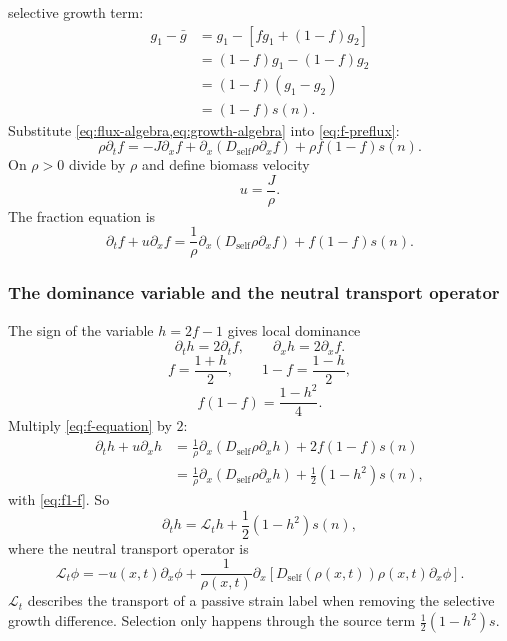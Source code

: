 \documentclass[11pt,a4paper]{report}
\newcommand{\Dself}{D_{\mathrm{self}}}
\newcommand{\pd}{\partial}
\newcommand{\Lop}{\mathcal L}
\begin{document}
	selective growth term:
	\begin{align}
		g_1-\bar g
		&=g_1-[fg_1+(1-f)g_2]\nonumber\\
		&=(1-f)g_1-(1-f)g_2\nonumber\\
		&=(1-f)(g_1-g_2)\nonumber\\
		&=(1-f)s(n).
		\label{eq:growth-algebra}
	\end{align}
	Substitute \cref{eq:flux-algebra,eq:growth-algebra} into \cref{eq:f-preflux}:
	\begin{equation}
		\rho\pd_t f=-J\pd_xf+
		\pd_x(\Dself\rho\pd_xf)+\rho f(1-f)s(n).
	\end{equation}
	On \(\rho>0\) divide by \(\rho\) and define biomass velocity
	\begin{equation}
		u=\frac{J}{\rho}.
		\label{eq:u-def}
	\end{equation}
	The fraction equation is
	\begin{equation}
		{
			\pd_t f+u\pd_xf
			=\frac1\rho\pd_x(\Dself\rho\pd_xf)+f(1-f)s(n).
		}
		\label{eq:f-equation}
	\end{equation}
	
	\subsubsection{The dominance variable and the neutral transport operator}
	
	The sign of the variable \(h=2f-1\) gives local dominance
	\begin{equation}
		\pd_t h=2\pd_t f,
		\qquad
		\pd_x h=2\pd_x f.
	\end{equation}
	\begin{equation}
		f=\frac{1+h}{2},
		\qquad
		1-f=\frac{1-h}{2},
	\end{equation}
	\begin{equation}
		f(1-f)=\frac{1-h^2}{4}.
		\label{eq:f1-f}
	\end{equation}
	Multiply \cref{eq:f-equation} by \(2\):
	\begin{align}
		\pd_t h+u\pd_xh
		&=\frac1\rho\pd_x(\Dself\rho\pd_xh)+2f(1-f)s(n)\nonumber\\
		&=\frac1\rho\pd_x(\Dself\rho\pd_xh)
		+\frac12(1-h^2)s(n),
	\end{align}
	with \cref{eq:f1-f}. So
	\begin{equation}
		{
			\pd_t h=\Lop_t h+\frac12(1-h^2)s(n),
		}
		\label{eq:h-equation}
	\end{equation}
	where the neutral transport operator is
	\begin{equation}
		{
			\Lop_t\phi=-u(x,t)\pd_x\phi+\frac1{\rho(x,t)}
			\pd_x\left[\Dself(\rho(x,t))\rho(x,t)\pd_x\phi\right].
		}
		\label{eq:Lop}
	\end{equation}
	\(\Lop_t\) describes the transport of a passive strain label when removing the selective growth difference. Selection only happens through the source term \(\frac12(1-h^2)s\).
\end{document}
